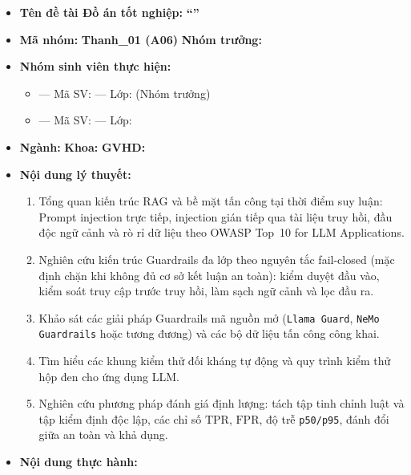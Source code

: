 {\small
\begin{itemize}
  \setlength{\itemsep}{1pt}
  \setlength{\parskip}{1pt}
  \setlength{\topsep}{2pt}
  \item \textbf{Tên đề tài Đồ án tốt nghiệp:} \textbf{``\titlethesis''}
  \item \textbf{Mã nhóm:} \textbf{Thanh\_01 (A06)} \quad \textbf{Nhóm trưởng:} \textbf{\studentname}
  \item \textbf{Nhóm sinh viên thực hiện:}
  \begin{itemize}
    \setlength{\itemsep}{0pt}
    \setlength{\parskip}{0pt}
    \setlength{\topsep}{1pt}
    \item \textbf{\studentname} --- Mã SV: \textbf{\mssv} --- Lớp: \textbf{\classid} (Nhóm trưởng)
    \item \textbf{\studentnametwo} --- Mã SV: \textbf{\mssvtwo} --- Lớp: \textbf{\classid}
  \end{itemize}
  \item \textbf{Ngành:} \major \quad \textbf{Khoa:} \faculty \quad \textbf{GVHD:} \textbf{\supervisor}
  \item \textbf{Nội dung lý thuyết:}
  \begin{enumerate}
    \setlength{\itemsep}{1pt}
    \setlength{\parskip}{0pt}
    \setlength{\topsep}{1pt}
    \item Tổng quan kiến trúc RAG và bề mặt tấn công tại thời điểm suy luận: Prompt injection trực tiếp, injection gián tiếp qua tài liệu truy hồi, đầu độc ngữ cảnh và rò rỉ dữ liệu theo OWASP Top~10 for LLM Applications.
    \item Nghiên cứu kiến trúc Guardrails đa lớp theo nguyên tắc fail-closed (mặc định chặn khi không đủ cơ sở kết luận an toàn): kiểm duyệt đầu vào, kiểm soát truy cập trước truy hồi, làm sạch ngữ cảnh và lọc đầu ra.
    \item Khảo sát các giải pháp Guardrails mã nguồn mở (\texttt{Llama Guard}, \texttt{NeMo Guardrails} hoặc tương đương) và các bộ dữ liệu tấn công công khai.
    \item Tìm hiểu các khung kiểm thử đối kháng tự động và quy trình kiểm thử hộp đen cho ứng dụng LLM.
    \item Nghiên cứu phương pháp đánh giá định lượng: tách tập tinh chỉnh luật và tập kiểm định độc lập, các chỉ số $\text{TPR}$, $\text{FPR}$, độ trễ \texttt{p50/p95}, đánh đổi giữa an toàn và khả dụng.
  \end{enumerate}
  \item \textbf{Nội dung thực hành:}
  \begin{enumerate}

\end{enumerate}
\end{itemize}}
